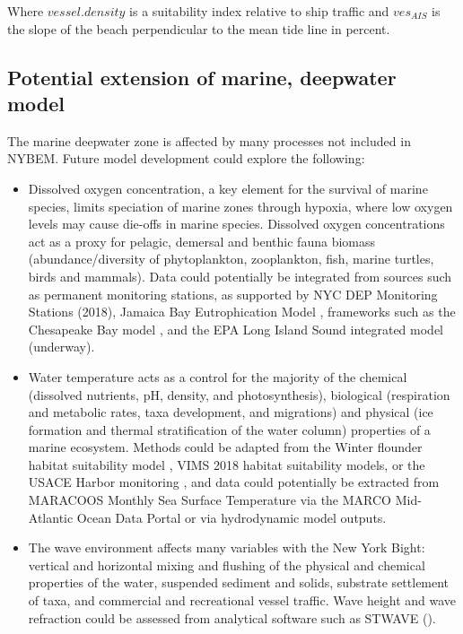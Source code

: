 \documentclass[
]{book}
\providecommand{\tightlist}{%
  \setlength{\itemsep}{0pt}\setlength{\parskip}{0pt}}
\begin{document}
Where \(vessel.density\) is a suitability index relative to ship traffic and \(ves_{AIS}\) is the slope of the beach perpendicular to the mean tide line in percent.

\hypertarget{potential-extension-of-marine-deepwater-model}{%
\subsection{Potential extension of marine, deepwater model}\label{potential-extension-of-marine-deepwater-model}}

The marine deepwater zone is affected by many processes not included in NYBEM. Future model development could explore the following:

\begin{itemize}
\tightlist
\item
  Dissolved oxygen concentration, a key element for the survival of marine species, limits speciation of marine zones through hypoxia, where low oxygen levels may cause die-offs in marine species. Dissolved oxygen concentrations act as a proxy for pelagic, demersal and benthic fauna biomass (abundance/diversity of phytoplankton, zooplankton, fish, marine turtles, birds and mammals). Data could potentially be integrated from sources such as permanent monitoring stations, as supported by NYC DEP Monitoring Stations (2018), Jamaica Bay Eutrophication Model \citep{fischbach_building_2018}, frameworks such as the Chesapeake Bay model \citep{cerco_threedimensional_1993}, and the EPA Long Island Sound integrated model (underway).\\
\item
  Water temperature acts as a control for the majority of the chemical (dissolved nutrients, pH, density, and photosynthesis), biological (respiration and metabolic rates, taxa development, and migrations) and physical (ice formation and thermal stratification of the water column) properties of a marine ecosystem. Methods could be adapted from the Winter flounder habitat suitability model \citep{banner_usfws_2001}, VIMS 2018 habitat suitability models, or the USACE Harbor monitoring \citep{usace_essential_2013}, and data could potentially be extracted from MARACOOS Monthly Sea Surface Temperature via the MARCO Mid-Atlantic Ocean Data Portal or via hydrodynamic model outputs.\\
\item
  The wave environment affects many variables with the New York Bight: vertical and horizontal mixing and flushing of the physical and chemical properties of the water, suspended sediment and solids, substrate settlement of taxa, and commercial and recreational vessel traffic. Wave height and wave refraction could be assessed from analytical software such as STWAVE (\citet{byrnes_effects_2004}).\\

\end{itemize}
\end{document}
